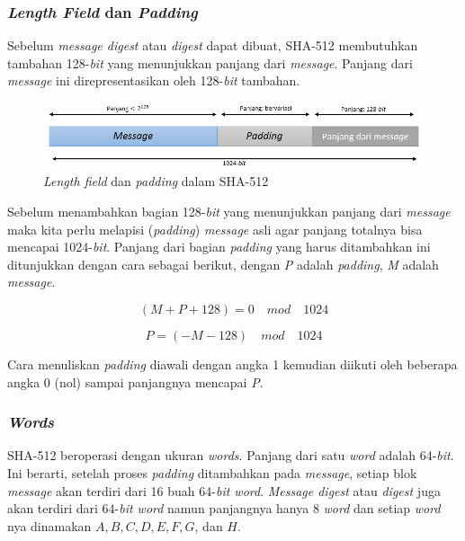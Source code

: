 \subsubsection{\textit{Length Field} dan \textit{Padding}}
Sebelum \textit{message digest} atau \textit{digest} dapat dibuat, SHA-512 membutuhkan tambahan 128-\textit{bit} yang menunjukkan panjang dari \textit{message}. Panjang dari \textit{message} ini direpresentasikan oleh 128-\textit{bit} tambahan.

\begin{figure}[ht]
	\includegraphics[scale=0.6]{Gambar/length_field_padding}
	\centering
	\caption{\textit{Length field} dan \textit{padding} dalam SHA-512}
\end{figure}

Sebelum menambahkan bagian 128-\textit{bit} yang menunjukkan panjang dari \textit{message} maka kita perlu melapisi (\textit{padding}) \textit{message} asli agar panjang totalnya bisa mencapai 1024-\textit{bit}. Panjang dari bagian \textit{padding} yang harus ditambahkan ini ditunjukkan dengan cara sebagai berikut, dengan \textit{P} adalah \textit{padding}, \textit{M} adalah \textit{message}.

\begin{displaymath}
	(M + P + 128) = 0\quad mod\quad 1024
\end{displaymath}

\begin{displaymath}
	P = (-M - 128)\quad mod\quad 1024
\end{displaymath}

Cara menuliskan \textit{padding} diawali dengan angka 1 kemudian diikuti oleh beberapa angka 0 (nol) sampai panjangnya mencapai \textit{P}.

\subsubsection{\textit{Words}}
SHA-512 beroperasi dengan ukuran \textit{words}. Panjang dari satu \textit{word} adalah 64-\textit{bit}. Ini berarti, setelah proses \textit{padding} ditambahkan pada \textit{message}, setiap blok \textit{message} akan terdiri dari 16 buah 64-\textit{bit word}. \textit{Message digest} atau \textit{digest} juga akan terdiri dari 64-\textit{bit word} namun panjangnya hanya 8 \textit{word} dan setiap \textit{word} nya dinamakan \begin{math}A, B, C, D, E, F, G\end{math}, dan \begin{math}H\end{math}.


